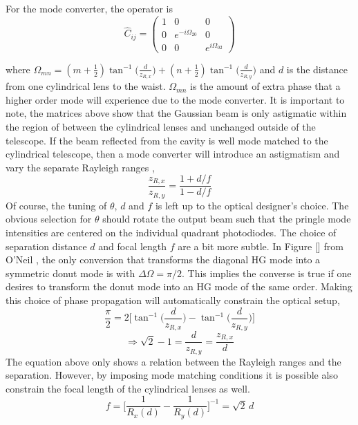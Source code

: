 For the mode converter, the operator is
\begin{equation} \label{convert}
\hat{C}_{ij} = 
\begin{pmatrix}
1			&0						& 0 
\\ 	0			&e^{-i \Omega_{20}}		& 0
\\ 	0			&0						&e^{i \Omega_{02}}			

\end{pmatrix}
\end{equation}

where $ \Omega_{mn} = (m+\frac{1}{2}) \tan^{-1}\bigg(\frac{d}{z_{R,x}}\bigg) + (n+\frac{1}{2}) \tan^{-1}\bigg(\frac{d}{z_{R,y}}\bigg) $ and $d$ is the distance from one cylindrical lens to the waist.  $\Omega_{mn}$ is the amount of extra phase that a higher order mode will experience due to the mode converter.  It is important to note, the matrices above show that the Gaussian beam is only astigmatic within the region of between the cylindrical lenses and unchanged outside of the telescope.   If the beam reflected from the cavity is well mode matched to the cylindrical telescope, then a mode converter will introduce an astigmatism and vary the separate Rayleigh ranges \cite{BEIJERSBERGEN},
\begin{equation}
\frac{z_{R,x}}{z_{R,y}} = \frac{1+d/f}{1-d/f}
\end{equation}
Of course, the tuning of $\theta$, $d$ and $f$ is left up to the optical designer's choice.  The obvious selection for $\theta$ should rotate the output beam such that the pringle mode intensities are centered on the individual quadrant photodiodes.  The choice of separation distance $d$ and focal length $f$ are a bit more subtle.  In Figure [] from O'Neil \cite{ONeilModeTransform}, the only conversion that transforms the diagonal HG mode into a symmetric donut mode is with $\Delta \Omega = \pi/2$. This implies the converse is  true if one desires to transform the donut mode into an HG mode of the same order. Making this choice of phase propagation will automatically constrain the optical setup,
	\begin{equation}
	\frac{\pi}{2} = 2\bigg[\tan^{-1}\bigg(\frac{d}{z_{R,x}}\bigg) - \tan^{-1} \bigg(\frac{d}{z_{R,y}} \bigg)  \bigg]
	\end{equation} 
	\begin{equation}
	  \Rightarrow \sqrt{2} - 1 = \frac{d}{z_{R,y}} = \frac{z_{R,x}}{d}
	\end{equation}
The equation above only shows a relation between the Rayleigh ranges and the separation. However, by imposing mode matching conditions it is possible also constrain the focal length of the cylindrical lenses as well.
	\begin{equation}
	f = \bigg[\frac{1}{R_x(d)} - \frac{1}{R_y(d)}\bigg]^{-1} = \sqrt{2}\,d
	\end{equation}

